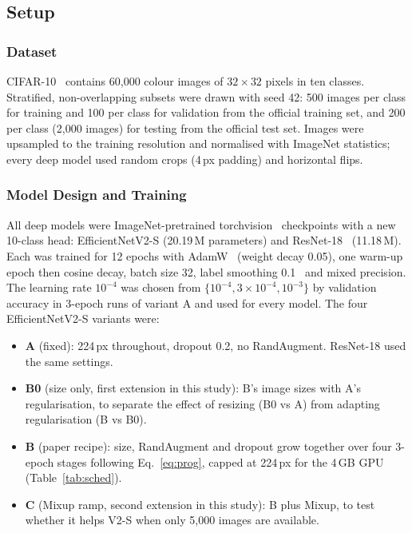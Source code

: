 \documentclass{COMPXXXX}
\begin{document}
\subsection{Setup}
\subsubsection{Dataset}
CIFAR-10~\cite{krizhevsky2009learning} contains 60{,}000 colour images of $32{\times}32$ pixels in ten
classes. Stratified, non-overlapping subsets were drawn with seed 42: 500 images per class for training
and 100 per class for validation from the official training set, and 200 per class (2{,}000 images)
for testing from the official test set. Images were upsampled to the training resolution and
normalised with ImageNet statistics; every deep model used random crops (4\,px padding) and horizontal
flips.

\subsubsection{Model Design and Training}
All deep models were ImageNet-pretrained torchvision~\cite{torchvision2016} checkpoints with a new
10-class head: EfficientNetV2-S (20.19\,M parameters) and ResNet-18~\cite{he2016deep} (11.18\,M). Each
was trained for 12 epochs with AdamW~\cite{loshchilov2019decoupled} (weight decay 0.05), one warm-up
epoch then cosine decay, batch size 32, label smoothing 0.1~\cite{szegedy2016rethinking} and mixed
precision. The learning rate $10^{-4}$ was chosen from $\{10^{-4}, 3{\times}10^{-4}, 10^{-3}\}$ by
validation accuracy in 3-epoch runs of variant A and used for every model. The four EfficientNetV2-S
variants were:
\begin{itemize}
\item \textbf{A} (fixed): 224\,px throughout, dropout 0.2, no RandAugment. ResNet-18 used the same settings.
\item \textbf{B0} (size only, first extension in this study): B's image sizes with A's regularisation, to separate
the effect of resizing (B0 vs A) from adapting regularisation (B vs B0).
\item \textbf{B} (paper recipe): size, RandAugment and dropout grow together over four 3-epoch stages
following Eq.~\eqref{eq:prog}, capped at 224\,px for the 4\,GB GPU (Table~\ref{tab:sched}).
\item \textbf{C} (Mixup ramp, second extension in this study): B plus Mixup, to test whether it helps V2-S when
only 5{,}000 images are available.
\end{itemize}
\end{document}
